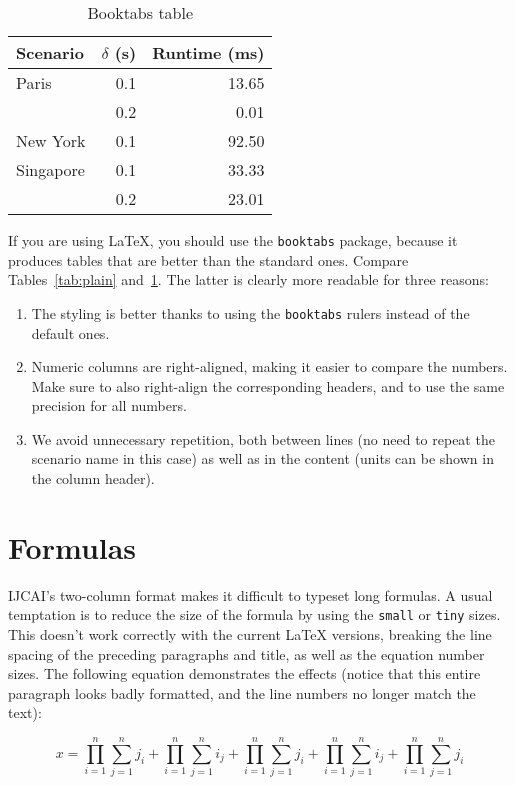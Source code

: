 \documentclass{article}
\begin{document}
\begin{table}
    \centering
    \begin{tabular}{lrr}
        \toprule
        Scenario  & $\delta$ (s) & Runtime (ms) \\
        \midrule
        Paris     & 0.1          & 13.65        \\
                  & 0.2          & 0.01         \\
        New York  & 0.1          & 92.50        \\
        Singapore & 0.1          & 33.33        \\
                  & 0.2          & 23.01        \\
        \bottomrule
    \end{tabular}
    \caption{Booktabs table}
    \label{tab:booktabs}
\end{table}

If you are using \LaTeX, you should use the {\tt booktabs} package, because it produces tables that are better than the standard ones. Compare Tables~\ref{tab:plain} and~\ref{tab:booktabs}. The latter is clearly more readable for three reasons:

\begin{enumerate}
    \item The styling is better thanks to using the {\tt booktabs} rulers instead of the default ones.
    \item Numeric columns are right-aligned, making it easier to compare the numbers. Make sure to also right-align the corresponding headers, and to use the same precision for all numbers.
    \item We avoid unnecessary repetition, both between lines (no need to repeat the scenario name in this case) as well as in the content (units can be shown in the column header).
\end{enumerate}

\section{Formulas}

IJCAI's two-column format makes it difficult to typeset long formulas. A usual temptation is to reduce the size of the formula by using the {\tt small} or {\tt tiny} sizes. This doesn't work correctly with the current \LaTeX{} versions, breaking the line spacing of the preceding paragraphs and title, as well as the equation number sizes. The following equation demonstrates the effects (notice that this entire paragraph looks badly formatted, and the line numbers no longer match the text):
%
\begin{tiny}
    \begin{equation}
        x = \prod_{i=1}^n \sum_{j=1}^n j_i + \prod_{i=1}^n \sum_{j=1}^n i_j + \prod_{i=1}^n \sum_{j=1}^n j_i + \prod_{i=1}^n \sum_{j=1}^n i_j + \prod_{i=1}^n \sum_{j=1}^n j_i
    \end{equation}
\end{tiny}%
\end{document}
